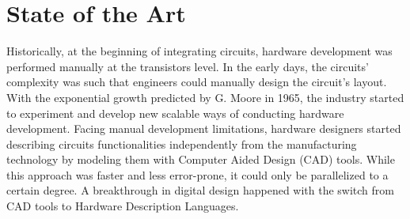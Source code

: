



\chapter{State of the Art}\label{stateofart}
Historically, at the beginning of integrating circuits, hardware development was
performed manually at the transistors level. In the early days, the circuits'
complexity was such that engineers could manually design the circuit's layout.
With the exponential growth predicted by G. Moore in 1965, the industry started
to experiment and develop new scalable ways of conducting hardware development.
Facing manual development limitations, hardware designers started describing
circuits functionalities independently from the manufacturing technology by
modeling them with Computer Aided Design (CAD) tools. While this approach was
faster and less error-prone, it could only be parallelized to a certain degree.
A breakthrough in digital design happened with the switch from CAD tools to
Hardware Description Languages.

